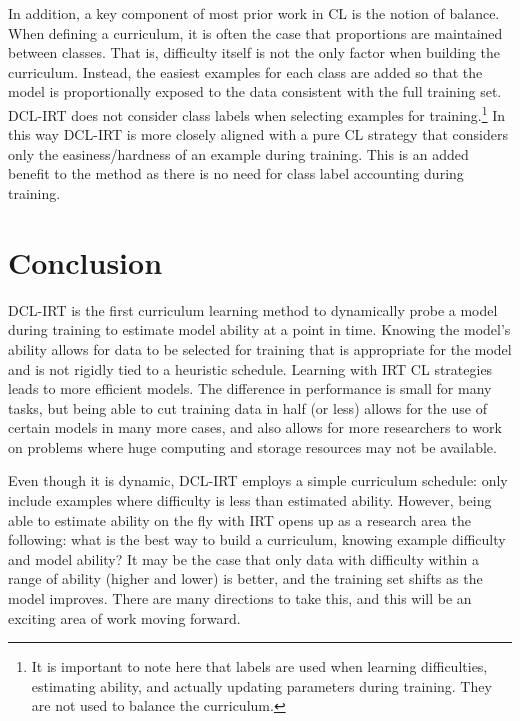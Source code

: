 \documentclass[letterpaper]{article} %
\begin{document}
In addition, a key component of most prior work in CL is the notion of balance.
When defining a curriculum, it is often the case that proportions are maintained between classes.
That is, difficulty itself is not the only factor when building the curriculum.
Instead, the easiest examples for each class are added so that the model is proportionally exposed to the data consistent with the full training set.
DCL-IRT does not consider class labels when selecting examples for training.\footnote{It is important to note here that labels are used when learning difficulties, estimating ability, and actually updating parameters during training. They are not used to balance the curriculum.}
In this way DCL-IRT is more closely aligned with a pure CL strategy that considers only the easiness/hardness of an example during training.
This is an added benefit to the method as there is no need for class label accounting during training. 




\section{Conclusion} 

DCL-IRT is the first curriculum learning method to dynamically probe a model during training to estimate model ability at a point in time.
Knowing the model's ability allows for data to be selected for training that is appropriate for the model and is not rigidly tied to a heuristic schedule.
Learning with IRT CL strategies leads to more efficient models.
The difference in performance is small for many tasks, but being able to cut training data in half (or less) allows for the use of certain models in many more cases, and also allows for more researchers to work on problems where huge computing and storage resources may not be available.

Even though it is dynamic, DCL-IRT employs a simple curriculum schedule: only include examples where difficulty is less than estimated ability.
However, being able to estimate ability on the fly with IRT opens up as a research area the following: what is the best way to build a curriculum, knowing example difficulty and model ability?
It may be the case that only data with difficulty within a range of ability (higher and lower) is better, and the training set shifts as the model improves.
There are many directions to take this, and this will be an exciting area of work moving forward.



\end{document}
